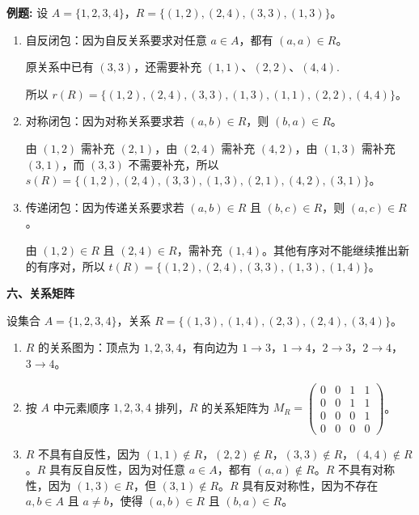 \noindent\textbf{例题:} 设 $A=\{1,2,3,4\}$，$R=\{(1,2),(2,4),(3,3),(1,3)\}$。

\begin{enumerate}
    \item 自反闭包：因为自反关系要求对任意 $a\in A$，都有 $(a,a)\in R$。
    
    原关系中已有 $(3,3)$，还需要补充 $(1,1)$、$(2,2)$、$(4,4)$.
    
    所以 $r(R)=\{(1,2),(2,4),(3,3),(1,3),(1,1),(2,2),(4,4)\}$。
    
    \item 对称闭包：因为对称关系要求若 $(a,b)\in R$，则 $(b,a)\in R$。
    
    由 $(1,2)$ 需补充 $(2,1)$，由 $(2,4)$ 需补充 $(4,2)$，由 $(1,3)$ 需补充 $(3,1)$，而 $(3,3)$ 不需要补充，所以 $s(R)=\{(1,2),(2,4),(3,3),(1,3),(2,1),(4,2),(3,1)\}$。
    
    \item 传递闭包：因为传递关系要求若 $(a,b)\in R$ 且 $(b,c)\in R$，则 $(a,c)\in R$。
    
    由 $(1,2)\in R$ 且 $(2,4)\in R$，需补充 $(1,4)$。其他有序对不能继续推出新的有序对，所以 $t(R)=\{(1,2),(2,4),(3,3),(1,3),(1,4)\}$。
\end{enumerate}


\noindent\textbf{六、关系矩阵}

设集合 \(A=\{1,2,3,4\}\)，关系 \(R=\{(1,3),(1,4),(2,3),(2,4),(3,4)\}\)。

\begin{enumerate}
    \item \(R\) 的关系图为：顶点为 \(1,2,3,4\)，有向边为 \(1\to3\)，\(1\to4\)，\(2\to3\)，\(2\to4\)，\(3\to4\)。

    \item 按 \(A\) 中元素顺序 \(1,2,3,4\) 排列，\(R\) 的关系矩阵为 \(M_R=\begin{pmatrix}0&0&1&1\\0&0&1&1\\0&0&0&1\\0&0&0&0\end{pmatrix}\)。

    \item \(R\) 不具有自反性，因为 \((1,1)\notin R\)，\((2,2)\notin R\)，\((3,3)\notin R\)，\((4,4)\notin R\)。\(R\) 具有反自反性，因为对任意 \(a\in A\)，都有 \((a,a)\notin R\)。\(R\) 不具有对称性，因为 \((1,3)\in R\)，但 \((3,1)\notin R\)。\(R\) 具有反对称性，因为不存在 \(a,b\in A\) 且 \(a\ne b\)，使得 \((a,b)\in R\) 且 \((b,a)\in R\)。
\end{enumerate}

